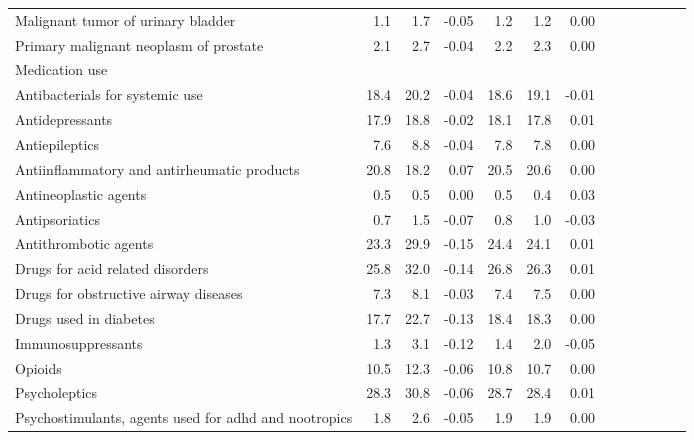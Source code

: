 \documentclass[11pt,]{article}
\begin{document}
\begin{longtable}{lrrrrrrrrrrrr}
      Malignant tumor of urinary bladder &  1.1 &   1.7 & -0.05 &  1.2 &   1.2 &  0.00 \\ 
      Primary malignant neoplasm of prostate &  2.1 &   2.7 & -0.04 &  2.2 &   2.3 &  0.00 \\ 
  Medication use &    &     &     &    &     &     \\ 
      Antibacterials for systemic use & 18.4 &  20.2 & -0.04 & 18.6 &  19.1 & -0.01 \\ 
      Antidepressants & 17.9 &  18.8 & -0.02 & 18.1 &  17.8 &  0.01 \\ 
      Antiepileptics &  7.6 &   8.8 & -0.04 &  7.8 &   7.8 &  0.00 \\ 
      Antiinflammatory and antirheumatic products & 20.8 &  18.2 &  0.07 & 20.5 &  20.6 &  0.00 \\ 
      Antineoplastic agents &  0.5 &   0.5 &  0.00 &  0.5 &   0.4 &  0.03 \\ 
      Antipsoriatics &  0.7 &   1.5 & -0.07 &  0.8 &   1.0 & -0.03 \\ 
      Antithrombotic agents & 23.3 &  29.9 & -0.15 & 24.4 &  24.1 &  0.01 \\ 
      Drugs for acid related disorders & 25.8 &  32.0 & -0.14 & 26.8 &  26.3 &  0.01 \\ 
      Drugs for obstructive airway diseases &  7.3 &   8.1 & -0.03 &  7.4 &   7.5 &  0.00 \\ 
      Drugs used in diabetes & 17.7 &  22.7 & -0.13 & 18.4 &  18.3 &  0.00 \\ 
      Immunosuppressants &  1.3 &   3.1 & -0.12 &  1.4 &   2.0 & -0.05 \\ 
      Opioids & 10.5 &  12.3 & -0.06 & 10.8 &  10.7 &  0.00 \\ 
      Psycholeptics & 28.3 &  30.8 & -0.06 & 28.7 &  28.4 &  0.01 \\ 
      Psychostimulants, agents used for adhd and nootropics &  1.8 &   2.6 & -0.05 &  1.9 &   1.9 &  0.00 \\ 
   \bottomrule\end{longtable}
\clearpage
{}
\end{document}
